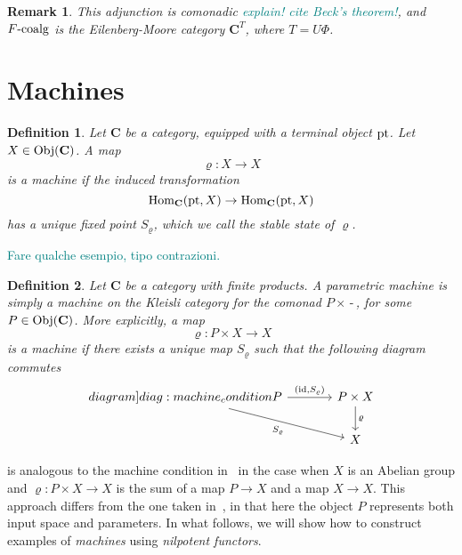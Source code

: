 \documentclass[12pt]{article}
\newtheorem{remark}{Remark}
\newtheorem{definition}{Definition}
\newcommand{\pietro}[1]{\textcolor{teal}{#1}}
\newcommand{\pt}{{\textnormal{pt}}}
\newcommand{\Hom}{{\textnormal{Hom}}}
\newcommand{\Obj}{{\textnormal{Obj}}}
\newcommand{\id}{{\textnormal{id}}}
\newcommand{\Cat}{{\mathbf{C}}}
\newcommand{\FCoalg}{{F\textnormal{-coalg}}}
\newcommand{\anon}{{\,\mbox{-}\,}}
\begin{document}
\begin{remark}
    This adjunction is comonadic \pietro{explain! cite Beck's theorem!}, and $\FCoalg$ is the Eilenberg-Moore category $\Cat^T$, where $T = U\Phi$.
\end{remark}

\section{Machines}

\begin{definition}\label{def:machine}
    Let $\Cat$ be a category, equipped with a terminal object $\pt$. Let $X \in \Obj(\Cat)$. A map
    \begin{equation*}
        \varrho \colon X \rightarrow X
    \end{equation*}
    is a {\em machine} if the induced transformation
    \begin{equation*}
        \Hom_\Cat(\pt, X) \rightarrow \Hom_\Cat(\pt, X)
    \end{equation*}
    has a unique fixed point $S_\varrho$, which we call the {\em stable state} of $\varrho$.
\end{definition}

\pietro{Fare qualche esempio, tipo contrazioni.}

\begin{definition}\label{def:parametric_machine}
    Let $\Cat$ be a category with finite products. A {\em parametric machine} is simply a machine on the Kleisli category for the comonad $P \times \anon$, for some $P \in \Obj(\Cat)$. More explicitly, a map
    \begin{equation*}
        \varrho \colon P \times X \rightarrow X
    \end{equation*}
    is a {\em machine} if there exists a unique map $S_\varrho$ such that the following diagram commutes
    \begin{equation}
        \begin{tikzcd}[column sep=large]\label[diagram]{diag:machine_condition}
            P \arrow[rightarrow]{r}{\left(\id, S_\varrho\right)}
            \arrow[rightarrow,swap]{dr}{S_\varrho}
            & P \times X \arrow[rightarrow]{d}{\varrho} \\
            & X
        \end{tikzcd}
    \end{equation}
\end{definition}

 is analogous to the machine condition in~\cite{2020arXiv200702777V} in the case when $X$ is an Abelian group and $\varrho\colon P \times X \rightarrow X$ is the sum of a map $P \rightarrow X$ and a map $X \rightarrow X$. This approach differs from the one taken in~\cite{2020arXiv200702777V}, in that here the object $P$ represents both input space and parameters. In what follows, we will show how to construct examples of {\em machines} using {\em nilpotent functors}.
\end{document}
